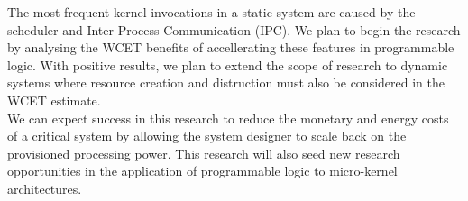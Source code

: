 \documentclass[10pt]{article}
\begin{document}
The most frequent kernel invocations in a static system are caused by the scheduler and Inter Process
Communication (IPC). We plan to begin the research by analysing the WCET benefits of accellerating these
features in programmable logic. With positive results, we plan to extend the scope of research to dynamic
systems where resource creation and distruction must also be considered in the WCET estimate.
\\

We can expect success in this research to reduce the monetary and energy costs of a critical system by
allowing the system designer to scale back on the provisioned processing power. This research will also
seed new research opportunities in the application of programmable logic to micro-kernel architectures.
\end{document}
